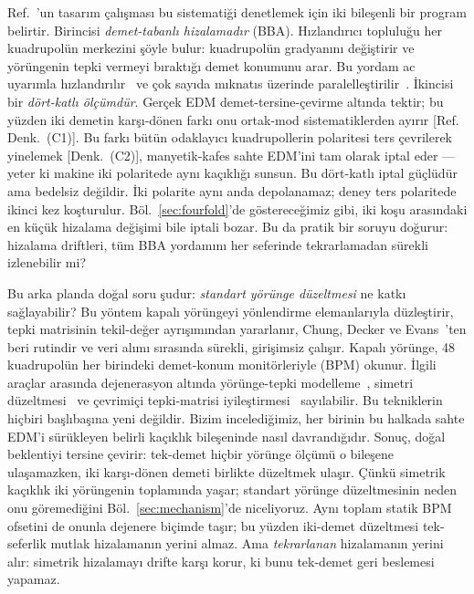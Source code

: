 \documentclass[aps,prab,reprint,superscriptaddress,nofootinbib]{revtex4-2}
\begin{document}
Ref.~\cite{omarov}'un tasarım çalışması bu sistematiği denetlemek için iki
bileşenli bir program belirtir. Birincisi \emph{demet-tabanlı hizalamadır} (BBA).
Hızlandırıcı topluluğu her kuadrupolün merkezini şöyle bulur: kuadrupolün gradyanını
değiştirir ve yörüngenin tepki vermeyi bıraktığı demet konumunu arar. Bu yordam ac
uyarımla hızlandırılır~\cite{marti} ve çok sayıda mıknatıs üzerinde
paralelleştirilir~\cite{huang}. İkincisi bir \emph{dört-katlı ölçümdür}. Gerçek EDM
demet-tersine-çevirme altında tektir; bu yüzden iki demetin karşı-dönen farkı onu
ortak-mod sistematiklerden ayırır [Ref.~\cite{omarov} Denk.~(C1)]. Bu farkı bütün
odaklayıcı kuadrupollerin polaritesi ters çevrilerek yinelemek [Denk.~(C2)],
manyetik-kafes sahte EDM'ini tam olarak iptal eder --- yeter ki makine iki
polaritede aynı kaçıklığı sunsun. Bu dört-katlı iptal güçlüdür ama bedelsiz
değildir. İki polarite aynı anda depolanamaz; deney ters polaritede ikinci kez
koşturulur. Böl.~\ref{sec:fourfold}'de göstereceğimiz gibi, iki koşu arasındaki en
küçük hizalama değişimi bile iptali bozar. Bu da pratik bir soruyu doğurur: hizalama
driftleri, tüm BBA yordamını her seferinde tekrarlamadan sürekli izlenebilir mi?

Bu arka planda doğal soru şudur: \emph{standart yörünge düzeltmesi} ne katkı
sağlayabilir? Bu yöntem kapalı yörüngeyi yönlendirme elemanlarıyla düzleştirir,
tepki matrisinin tekil-değer ayrışımından yararlanır, Chung, Decker ve
Evans~\cite{chung1993}'ten beri rutindir ve veri alımı sırasında sürekli, girişimsiz
çalışır. Kapalı yörünge, 48 kuadrupolün her birindeki demet-konum monitörleriyle
(BPM) okunur. İlgili araçlar arasında dejenerasyon altında yörünge-tepki
modelleme~\cite{wegscheider}, simetri düzeltmesi~\cite{mirza} ve çevrimiçi
tepki-matrisi iyileştirmesi~\cite{ziemann} sayılabilir. Bu tekniklerin hiçbiri
başlıbaşına yeni değildir. Bizim incelediğimiz, her birinin bu halkada sahte EDM'i
sürükleyen belirli kaçıklık bileşeninde nasıl davrandığıdır. Sonuç, doğal beklentiyi
tersine çevirir: tek-demet hiçbir yörünge ölçümü o bileşene ulaşamazken, iki
karşı-dönen demeti birlikte düzeltmek ulaşır. Çünkü simetrik kaçıklık iki yörüngenin
toplamında yaşar; standart yörünge düzeltmesinin neden onu göremediğini
Böl.~\ref{sec:mechanism}'de niceliyoruz. Aynı toplam statik BPM ofsetini de onunla
dejenere biçimde taşır;
bu yüzden iki-demet düzeltmesi tek-seferlik mutlak hizalamanın yerini almaz. Ama
\emph{tekrarlanan} hizalamanın yerini alır: simetrik hizalamayı drifte karşı korur,
ki bunu tek-demet geri beslemesi yapamaz.
\end{document}
